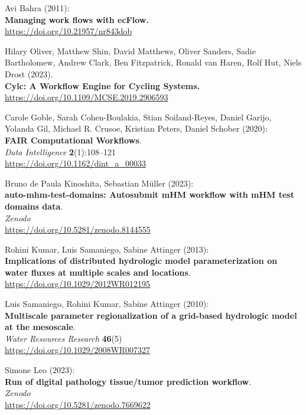 \documentclass[10pt,letterpaper]{article}
\begin{document}
\begin{thebibliography}{10}
\begin{small}

Avi Bahra (2011):\\
\textbf{Managing work flows with ecFlow.}\\
\url{https://doi.org/10.21957/nr843dob}


Hilary Oliver, Matthew Shin, David Matthews, Oliver Sanders, Sadie Bartholomew, Andrew Clark, Ben Fitzpatrick, Ronald van Haren, Rolf Hut, Niels Drost
(2023).\\
\textbf{Cylc: A Workflow Engine for Cycling Systems.}\\
\url{https://doi.org/10.1109/MCSE.2019.2906593}



Carole Goble, Sarah Cohen-Boulakia, Stian Soiland-Reyes, Daniel Garijo, Yolanda Gil, Michael R. Crusoe, Kristian Peters, Daniel Schober (2020):\\
\textbf{FAIR Computational Workflows}.\\
\emph{Data Intelligence} \textbf{2}(1):108--121\\
\url{https://doi.org/10.1162/dint_a_00033}




Bruno de Paula Kinoshita, Sebastian Müller (2023):\\
\textbf{auto-mhm-test-domains: Autosubmit mHM workflow with mHM test domains data}.\\
\emph{Zenodo}\\
\url{https://doi.org/10.5281/zenodo.8144555}

 Rohini Kumar, Luis Samaniego, Sabine Attinger (2013):\\
\textbf{Implications of distributed hydrologic model parameterization on water fluxes at multiple scales and locations}.\\
\url{https://doi.org/10.1029/2012WR012195}

Luis Samaniego, Rohini Kumar, Sabine Attinger (2010):\\
\textbf{Multiscale parameter regionalization of a grid-based hydrologic model at the mesoscale}.\\
\emph{Water Resources Research} \textbf{46}(5)\\
\url{https://doi.org/10.1029/2008WR007327}

 Simone Leo (2023):\\
\textbf{Run of digital pathology tissue/tumor prediction workflow}.\\
\emph{Zenodo}\\
\url{https://doi.org/10.5281/zenodo.7669622}


\end{small}
\end{thebibliography}
\end{document}
